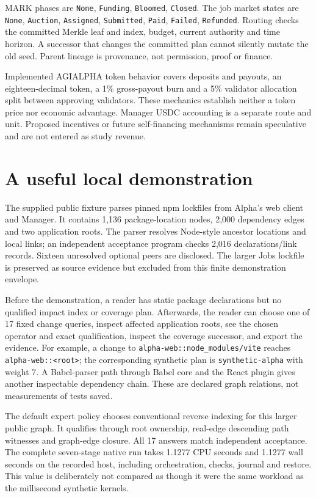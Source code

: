 \documentclass[11pt,letterpaper]{article}
\begin{document}
\begin{samepage}
MARK phases are \texttt{None}, \texttt{Funding}, \texttt{Bloomed}, \texttt{Closed}. The job market states are \texttt{None}, \texttt{Auction}, \texttt{Assigned}, \texttt{Submitted}, \texttt{Paid}, \texttt{Failed}, \texttt{Refunded}. Routing checks the committed Merkle leaf and index, budget, current authority and time horizon. A successor that changes the committed plan cannot silently mutate the old seed. Parent lineage is provenance, not permission, proof or finance.
\end{samepage}

Implemented AGIALPHA token behavior covers deposits and payouts, an eighteen-decimal token, a 1\% gross-payout burn and a 5\% validator allocation split between approving validators. These mechanics establish neither a token price nor economic advantage. Manager USDC accounting is a separate route and unit. Proposed incentives or future self-financing mechanisms remain speculative and are not entered as study revenue.

\FloatBarrier
\section{A useful local demonstration}
\label{sec:demo}
The supplied public fixture parses pinned npm lockfiles from Alpha's web client and Manager. It contains 1,136 package-location nodes, 2,000 dependency edges and two application roots. The parser resolves Node-style ancestor locations and local links; an independent acceptance program checks 2,016 declarations/link records. Sixteen unresolved optional peers are disclosed. The larger Jobs lockfile is preserved as source evidence but excluded from this finite demonstration envelope.

Before the demonstration, a reader has static package declarations but no qualified impact index or coverage plan. Afterwards, the reader can choose one of 17 fixed change queries, inspect affected application roots, see the chosen operator and exact qualification, inspect the coverage successor, and export the evidence. For example, a change to \texttt{alpha-web::node\_modules/vite} reaches \texttt{alpha-web::<root>}; the corresponding synthetic plan is \texttt{synthetic-alpha} with weight 7. A Babel-parser path through Babel core and the React plugin gives another inspectable dependency chain. These are declared graph relations, not measurements of tests saved.

The default expert policy chooses conventional reverse indexing for this larger public graph. It qualifies through root ownership, real-edge descending path witnesses and graph-edge closure. All 17 answers match independent acceptance. The complete seven-stage native run takes 1.1277 CPU seconds and 1.1277 wall seconds on the recorded host, including orchestration, checks, journal and restore. This value is deliberately not compared as though it were the same workload as the millisecond synthetic kernels.
\end{document}
